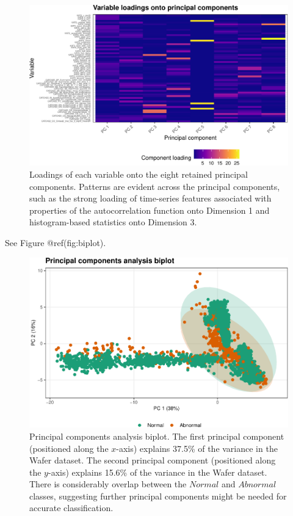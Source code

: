 \documentclass{article}
\begin{document}
\begin{figure}
\centering
\includegraphics{olet5610_report_files/figure-latex/loadplot-1.pdf}
\caption{Loadings of each variable onto the eight retained principal
components. Patterns are evident across the principal components, such
as the strong loading of time-series features associated with properties
of the autocorrelation function onto Dimension 1 and histogram-based
statistics onto Dimension 3.}
\end{figure}

See Figure @ref(fig:biplot).

\begin{figure}
\centering
\includegraphics{olet5610_report_files/figure-latex/biplot-1.pdf}
\caption{Principal components analysis biplot. The first principal
component (positioned along the \(x\)-axis) explains 37.5\% of the
variance in the Wafer dataset. The second principal component
(positioned along the \(y\)-axis) explains 15.6\% of the variance in the
Wafer dataset. There is considerably overlap between the \(Normal\) and
\(Abnormal\) classes, suggesting further principal components might be
needed for accurate classification.}
\end{figure}
\end{document}
